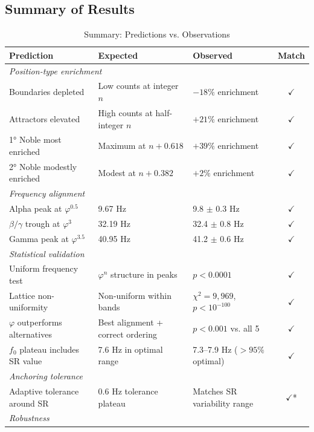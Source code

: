 \documentclass[11pt,a4paper]{article}
\newcommand{\phisym}{\varphi}
\newcommand{\fzero}{f_0}
\begin{document}
\subsection{Summary of Results}

\begin{table}[H]
\centering
\caption{Summary: Predictions vs. Observations}
\label{tab:summary}
\begin{tabular}{@{}p{5cm}p{4cm}p{4cm}c@{}}
\toprule
Prediction & Expected & Observed & Match \\
\midrule
\multicolumn{4}{l}{\textit{Position-type enrichment}} \\
Boundaries depleted & Low counts at integer $n$ & $-18\%$ enrichment & $\checkmark$ \\
Attractors elevated & High counts at half-integer $n$ & $+21\%$ enrichment & $\checkmark$ \\
1° Noble most enriched & Maximum at $n + 0.618$ & $+39\%$ enrichment & $\checkmark$ \\
2° Noble modestly enriched & Modest at $n + 0.382$ & $+2\%$ enrichment & $\checkmark$ \\
\midrule
\multicolumn{4}{l}{\textit{Frequency alignment}} \\
Alpha peak at $\phisym^{0.5}$ & 9.67 Hz & 9.8 $\pm$ 0.3 Hz & $\checkmark$ \\
$\beta/\gamma$ trough at $\phisym^3$ & 32.19 Hz & 32.4 $\pm$ 0.8 Hz & $\checkmark$ \\
Gamma peak at $\phisym^{3.5}$ & 40.95 Hz & 41.2 $\pm$ 0.6 Hz & $\checkmark$ \\
\midrule
\multicolumn{4}{l}{\textit{Statistical validation}} \\
Uniform frequency test & $\phisym^n$ structure in peaks & $p < 0.0001$ & $\checkmark$ \\
Lattice non-uniformity & Non-uniform within bands & $\chi^2 = 9{,}969$, $p < 10^{-100}$ & $\checkmark$ \\
$\phisym$ outperforms alternatives & Best alignment + correct ordering & $p < 0.001$ vs. all 5 & $\checkmark$ \\
$\fzero$ plateau includes SR value & 7.6 Hz in optimal range & 7.3--7.9 Hz ($>95\%$ optimal) & $\checkmark$ \\
\midrule
\multicolumn{4}{l}{\textit{Anchoring tolerance}} \\
Adaptive tolerance around SR & 0.6 Hz tolerance plateau & Matches SR variability range & $\checkmark$* \\
\midrule
\multicolumn{4}{l}{\textit{Robustness}} \\

\end{tabular}
\end{table}
\end{document}
